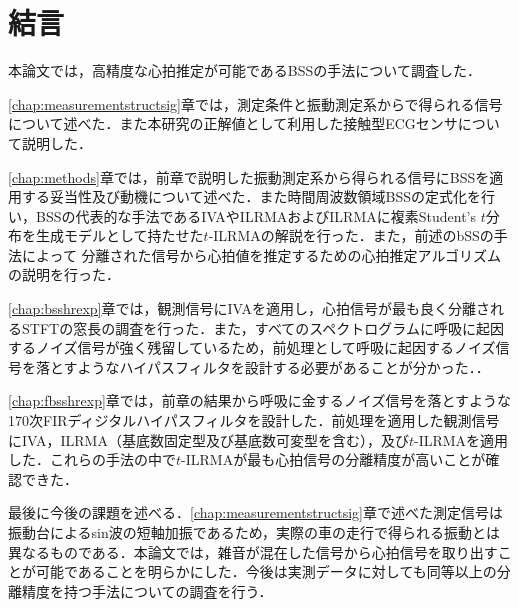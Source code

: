 \chapter{結言}
\label{chap:con}

本論文では，高精度な心拍推定が可能であるBSSの手法について調査した．

\ref{chap:measurementstructsig}章では，測定条件と振動測定系からで得られる信号について述べた．また本研究の正解値として利用した接触型ECGセンサについて説明した．

\ref{chap:methods}章では，前章で説明した振動測定系から得られる信号にBSSを適用する妥当性及び動機について述べた．また時間周波数領域BSSの定式化を行い，BSSの代表的な手法であるIVAやILRMAおよびILRMAに複素Student's $t$分布を生成モデルとして持たせた$t$-ILRMAの解説を行った．また，前述のbSSの手法によって
分離された信号から心拍値を推定するための心拍推定アルゴリズムの説明を行った．

\ref{chap:bsshrexp}章では，観測信号にIVAを適用し，心拍信号が最も良く分離されるSTFTの窓長の調査を行った．また，すべてのスペクトログラムに呼吸に起因するノイズ信号が強く残留しているため，前処理として呼吸に起因するノイズ信号を落とすようなハイパスフィルタを設計する必要があることが分かった．．

\ref{chap:fbsshrexp}章では，前章の結果から呼吸に金するノイズ信号を落とすような170次FIRディジタルハイパスフィルタを設計した．前処理を適用した観測信号にIVA，ILRMA（基底数固定型及び基底数可変型を含む），及び$t$-ILRMAを適用した．これらの手法の中で$t$-ILRMAが最も心拍信号の分離精度が高いことが確認できた．

最後に今後の課題を述べる．\ref{chap:measurementstructsig}章で述べた測定信号は振動台によるsin波の短軸加振であるため，実際の車の走行で得られる振動とは異なるものである．本論文では，雑音が混在した信号から心拍信号を取り出すことが可能であることを明らかにした．今後は実測データに対しても同等以上の分離精度を持つ手法についての調査を行う．